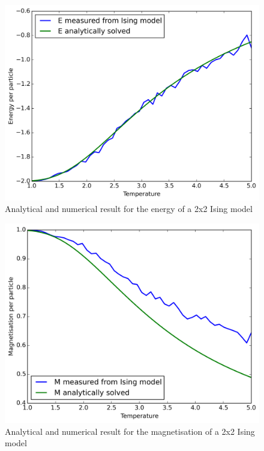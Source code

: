 \documentclass[11pt,a4paper,draft]{article}
\numberwithin{equation}{section}
\newcommand{\figurewidth}{.85\textwidth}
\begin{document}
\begin{figure}
\centering
\includegraphics[width=\figurewidth]{pics/aE.png}
\caption{Analytical and numerical result for the energy 
of a 2x2 Ising model}
\label{fig:aE}
\end{figure}

\begin{figure}
\centering
\includegraphics[width=\figurewidth]{pics/aM.png}
\caption{Analytical and numerical result for the magnetisation 
of a 2x2 Ising model}
\label{fig:aM}
\end{figure}
\end{document}
